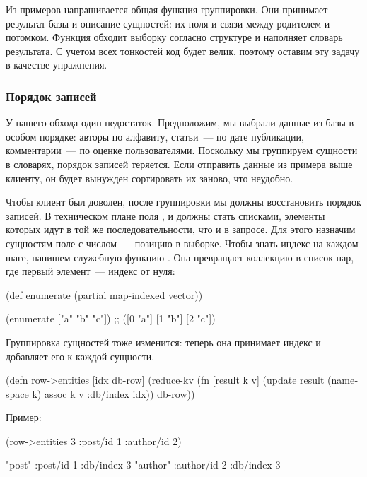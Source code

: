 Из примеров напрашивается общая функция группировки. Они принимает результат базы и описание сущностей: их поля и связи между родителем и потомком. Функция обходит выборку согласно структуре и наполняет словарь результата. С учетом всех тонкостей код будет велик, поэтому оставим эту задачу в качестве упражнения.

\subsubsection{Порядок записей}

У нашего обхода один недостаток. Предположим, мы выбрали данные из базы в особом порядке: авторы по алфавиту, статьи~--- по дате публикации, комментарии~--- по оценке пользователями. Поскольку мы группируем сущности в словарях, порядок записей теряется. Если отправить данные из примера выше клиенту, он будет вынужден сортировать их заново, что неудобно.

Чтобы клиент был доволен, после группировки мы должны восстановить порядок записей. В техническом плане поля ,  и  должны стать списками, элементы которых идут в той же последовательности, что и в запросе. Для этого назначим сущностям поле  с числом~--- позицию в выборке. Чтобы знать индекс на каждом шаге, напишем служебную функцию . Она превращает коллекцию в список пар, где первый элемент~--- индекс от нуля:

\begin{english}
  \begin{clojure}
(def enumerate
  (partial map-indexed vector))

(enumerate ["a" "b" "c"])
;; ([0 "a"] [1 "b"] [2 "c"])
  \end{clojure}
\end{english}

Группировка сущностей тоже изменится: теперь она принимает индекс и добавляет его к каждой сущности.

\begin{english}
  \begin{clojure}
(defn row->entities [idx db-row]
  (reduce-kv
   (fn [result k v]
     (update result
             (namespace k)
             assoc
             k v
             :db/index idx))
   {}
   db-row))
  \end{clojure}
\end{english}

Пример:

\begin{english}
  \begin{clojure}
(row->entities 3 {:post/id 1 :author/id 2})

{"post" {:post/id 1 :db/index 3}
 "author" {:author/id 2 :db/index 3}}
  \end{clojure}
\end{english}

